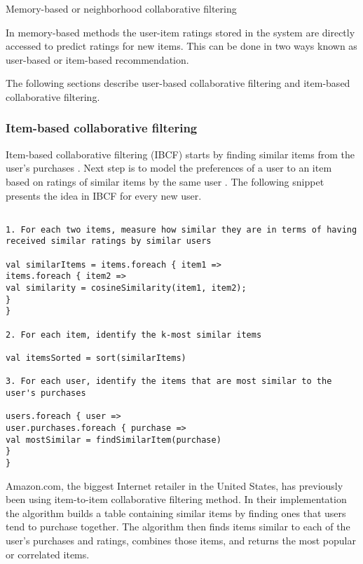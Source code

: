 \documentclass[main.tex]{thesis.tex}
\begin{document}
Memory-based or neighborhood collaborative filtering

In memory-based methods the user-item ratings stored in the system are directly accessed to predict ratings for new items.
This can be done in two ways known as user-based or item-based recommendation.

The following sections describe user-based collaborative filtering and item-based collaborative filtering.

\subsubsection{Item-based collaborative filtering}

Item-based collaborative filtering (IBCF) starts by finding similar items from the user's purchases \cite{gorakala15}.
Next step is to model the preferences of a user to an item based on ratings of similar items by the same user \cite{ricci11}.
The following snippet presents the idea in IBCF for every new user.

\lstset{
	columns=flexible,
	frame=single,
	breaklines=true
}

\begin{lstlisting}[caption=Item-Based Collaborative Filtering algorithm \cite{gorakala15}]

1. For each two items, measure how similar they are in terms of having received similar ratings by similar users

val similarItems = items.foreach { item1 =>
items.foreach { item2 =>
val similarity = cosineSimilarity(item1, item2);
}
}

2. For each item, identify the k-most similar items

val itemsSorted = sort(similarItems)

3. For each user, identify the items that are most similar to the user's purchases

users.foreach { user =>
user.purchases.foreach { purchase =>
val mostSimilar = findSimilarItem(purchase)
}
}

\end{lstlisting}

Amazon.com, the biggest Internet retailer in the United States, has previously been using item-to-item collaborative filtering method.
In their implementation the algorithm builds a table containing similar items by finding ones that users tend to purchase together.
The algorithm then finds items similar to each of the user's purchases and ratings, combines those items, and returns the most popular or correlated items. \cite{linden03}
\end{document}
